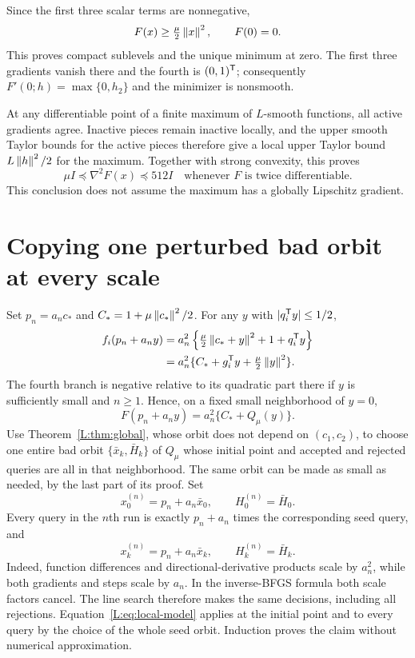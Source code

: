 Since the first three scalar terms are nonnegative,
\[
 F(x)\ge\tfrac\mu2\left\lVert x\right\rVert^2,\qquad F(0)=0.
\]
This proves compact sublevels and the unique minimum at zero. The first three gradients vanish there and the fourth is $(0,1)^{\mathsf T}$; consequently $F'(0;h)=\max\{0,h_2\}$ and the minimizer is nonsmooth.

At any differentiable point of a finite maximum of $L$-smooth functions, all active gradients agree. Inactive pieces remain inactive locally, and the upper smooth Taylor bounds for the active pieces therefore give a local upper Taylor bound $L\left\lVert h\right\rVert^2/2$ for the maximum. Together with strong convexity, this proves
\begin{equation}\label{L:eq:Hbounds}
 \mu I\preceq\nabla^2F(x)\preceq512I
 \quad\text{whenever }F\text{ is twice differentiable}.
\end{equation}
This conclusion does not assume the maximum has a globally Lipschitz gradient.


\setcounter{section}{5}
\setcounter{theorem}{2}
\setcounter{lemma}{2}
\setcounter{corollary}{0}
\setcounter{proposition}{0}
\setcounter{remark}{0}
\setcounter{equation}{12}


\section{Copying one perturbed bad orbit at every scale}

Set $p_n=a_nc_*$ and $C_*=1+\mu\left\lVert c_*\right\rVert^2/2$. For any $y$ with $|q_i^{\mathsf T} y|\le1/2$,
\begin{align*}
 f_i(p_n+a_ny)
 &=a_n^2\left\{\tfrac\mu2\left\lVert c_*+y\right\rVert^2+1+q_i^{\mathsf T} y\right\}\\
 &=a_n^2\{C_*+g_i^{\mathsf T} y+\tfrac\mu2\left\lVert y\right\rVert^2\}.
\end{align*}
The fourth branch is negative relative to its quadratic part there if $y$ is sufficiently small and $n\ge1$. Hence, on a fixed small neighborhood of $y=0$,
\begin{equation}\label{L:eq:local-model}
 F(p_n+a_ny)=a_n^2\{C_*+Q_\mu(y)\}.
\end{equation}
Use Theorem~\ref{L:thm:global}, whose orbit does not depend on $(c_1,c_2)$, to choose one entire bad orbit $\{\bar x_k,\bar H_k\}$ of $Q_\mu$ whose initial point and accepted and rejected queries are all in that neighborhood. The same orbit can be made as small as needed, by the last part of its proof. Set
\[
 x_0^{(n)}=p_n+a_n\bar x_0,\qquad H_0^{(n)}=\bar H_0.
\]
Every query in the $n$th run is exactly $p_n+a_n$ times the corresponding seed query, and
\[
 x_k^{(n)}=p_n+a_n\bar x_k,\qquad H_k^{(n)}=\bar H_k.
\]
Indeed, function differences and directional-derivative products scale by $a_n^2$, while both gradients and steps scale by $a_n$. In the inverse-BFGS formula both scale factors cancel. The line search therefore makes the same decisions, including all rejections. Equation~\eqref{L:eq:local-model} applies at the initial point and to every query by the choice of the whole seed orbit. Induction proves the claim without numerical approximation.


